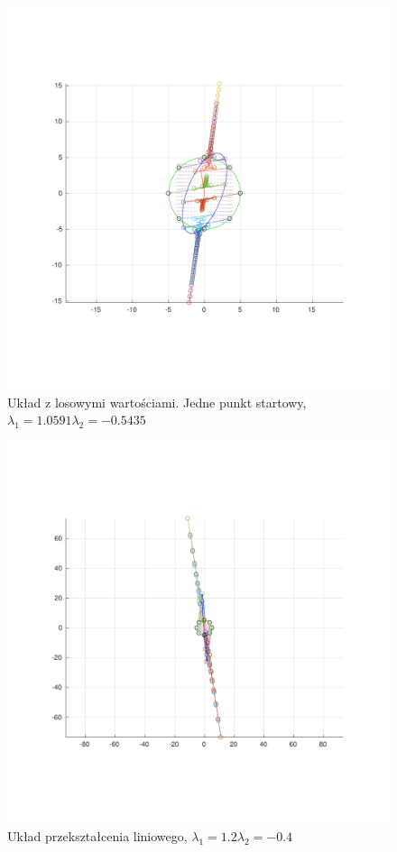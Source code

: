 \documentclass[]{article}
\begin{document}
\begin{figure}[H]
	\centering
	\includegraphics[width=0.99\linewidth]{demo3}
	\caption{Układ z losowymi wartościami. Jedne punkt startowy, $\lambda_1=1.0591 \lambda_2=-0.5435 $}
	\label{fig:demo2}
\end{figure}

\begin{figure}[H]
	\centering
	\includegraphics[width=0.99\linewidth]{linear}
	\caption{Układ przekształcenia liniowego, $\lambda_1=1.2 \lambda_2=-0.4 $}
	\label{fig:linear}
\end{figure}
\end{document}
